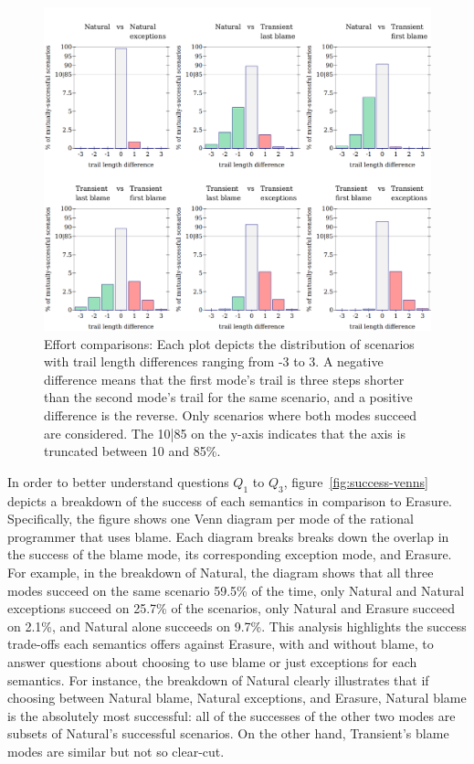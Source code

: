 \begin{figure}
  \centering
  \includegraphics[width=\textwidth]{./plots/bt-length-comparisons}
  \caption{Effort comparisons: Each plot depicts the distribution of scenarios with trail length differences ranging from -3 to 3.
  A negative difference means that the first mode's trail is three steps shorter than the second mode's trail for the same scenario, and a positive difference is the reverse.
  Only scenarios where both modes succeed are considered.
  The 10|85 on the y-axis indicates that the axis is truncated between 10 and 85\%.}
  \label{fig:effort-comparisons}
\end{figure}

In order to better understand questions $Q_1$ to $Q_3$, figure~\ref{fig:success-venns} depicts a breakdown of the success of each semantics in comparison to Erasure.
Specifically, the figure shows one Venn diagram per mode of the rational programmer that uses blame.
Each diagram breaks breaks down the overlap in the success of the blame mode, its corresponding exception mode, and Erasure.
For example, in the breakdown of Natural, the diagram shows that all three modes succeed on the same scenario 59.5\% of the time, only Natural and Natural exceptions succeed on 25.7\% of the scenarios, only Natural and Erasure succeed on 2.1\%, and Natural alone succeeds on 9.7\%.
This analysis highlights the success trade-offs each semantics offers against Erasure, with and without blame, to answer questions about choosing to use blame or just exceptions for each semantics.
For instance, the breakdown of Natural clearly illustrates that if choosing between Natural blame, Natural exceptions, and Erasure, Natural blame is the absolutely most successful: all of the successes of the other two modes are subsets of Natural's successful scenarios.
On the other hand, Transient's blame modes are similar but not so clear-cut.


